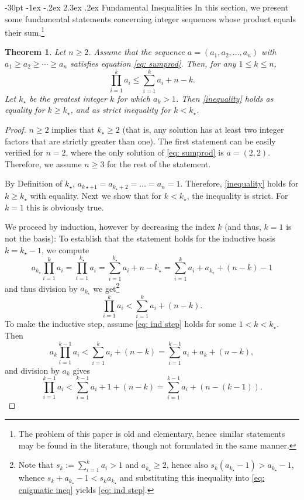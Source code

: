 \documentclass[10pt]{article}
\makeatletter
\renewcommand\section{\@startsection {section}{1}{\z@}
  {-30pt \@plus -1ex \@minus -.2ex}
  {2.3ex \@plus .2ex}
  {\normalfont\normalsize\bfseries\boldmath}}
\newtheorem{theorem}{Theorem}
\theoremstyle{definition}
\theoremstyle{remark}
\numberwithin{equation}{section}
\makeatother
\begin{document}
\section{Fundamental Inequalities}\label{sec: inequalities}
In this section, we present some fundamental statements concerning integer sequences whose product equals their sum.\footnote{The problem of this paper is old and elementary, hence similar statements may be found in the literature, though not formulated in the same manner.}
\begin{theorem}\label{prop: 1}
Let $n\geq 2$. Assume that the sequence $a=(a_1,a_2,\dots,a_n)$ with \(a_1 \geq a_2 \geq \cdots \geq a_n\) satisfies equation \eqref{eq: sumprod}. Then, for any \(1 \leq k \leq n\), 
\begin{equation}\label{inequality}
\prod_{i=1}^k a_i \leq \sum_{i=1}^k a_i + n - k.
\end{equation}
Let $k_\star$ be the greatest integer $k$ for which $a_k>1$. Then \eqref{inequality} holds as equality for $k\geq k_\star$,
and as strict inequality for $k<k_\star$. 
\end{theorem}
\begin{proof}
$n\geq 2$ implies that $k_\star\geq 2$ (that is, any solution has at least two integer factors that are strictly greater than one). The first statement can be easily verified for $n=2$, where the only solution of \eqref{eq: sumprod} is $a=(2,2)$. Therefore, we assume $n\geq 3$ for the rest of the statement.

By Definition of $k_\star$, $a_{k\star+1}=a_{k_\star+2}=\dots=a_n=1$. Therefore, \eqref{inequality} holds for $k\geq k_\star$ with equality. Next we show that for $k<k_\star$, the inequality is strict. For $k=1$ this is obviously true.




We proceed by induction, however by decreasing the index $k$ (and thus, $k=1$ is not the basis): To establish that the statement holds for the inductive basis $k=k_\star-1$, we compute
\begin{equation}\label{eq: enigmatic ineq}
a_{k_\star}\prod_{i=1}^k a_i= \prod_{i=1}^{k_\star} a_i =\sum_{i=1}^{k_\star} a_i + n - k_\star= \sum_{i=1}^k a_i+a_{k_\star}+(n-k)-1
\end{equation}
and thus division by $a_{k_\star}$ we get\footnote{Note that $s_k:=\sum_{i=1}^k a_i>1$ and $a_{k_\star}\geq 2$, hence also $s_k(a_{k_\star}-1)>a_{k_\star}-1$, whence $s_k+a_{k_\star}-1<s_k a_{k_\star}$ and substituting this inequality into \eqref{eq: enigmatic ineq} yields \eqref{eq: ind step}.}
\begin{equation}\label{eq: ind step}
\prod_{i=1}^k a_i <\sum_{i=1}^k a_i+(n-k).
\end{equation}
To make the inductive step, assume \eqref{eq: ind step} holds for some $1<k<k_\star$. Then
$$
a_k \prod_{i=1}^{k-1}a_i<\sum_{i=1}^k a_i+(n-k)=\sum_{i=1}^{k-1}a_i+a_k+(n-k),
$$
and division by $a_k$ gives
$$
\prod_{i=1}^{k-1}a_i<\sum_{i=1}^{k-1}a_i+1+(n-k)=\sum_{i=1}^{k-1}a_i+(n-(k-1)).
$$
\end{proof}
\end{document}
